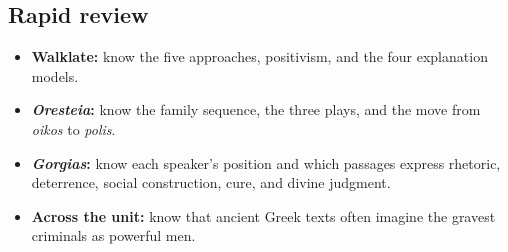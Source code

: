 \documentclass[11pt]{article}
\begin{document}
\subsection*{Rapid review}
\begin{itemize}
\item \textbf{Walklate:} know the five approaches, positivism, and the four explanation models.
\item \textbf{\textit{Oresteia}:} know the family sequence, the three plays, and the move from \textit{oikos} to \textit{polis}.
\item \textbf{\textit{Gorgias}:} know each speaker's position and which passages express rhetoric, deterrence, social construction, cure, and divine judgment.
\item \textbf{Across the unit:} know that ancient Greek texts often imagine the gravest criminals as powerful men.
\end{itemize}
\end{document}
